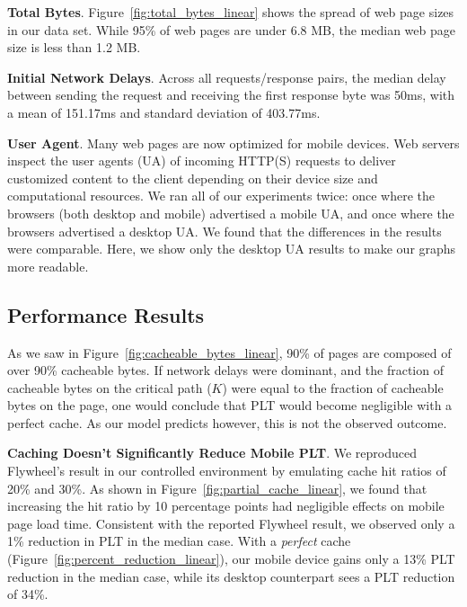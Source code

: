 \textbf{Total Bytes}. Figure~\ref{fig:total_bytes_linear} shows the spread of web page sizes in our data set. While 95\% of web pages are under 6.8 MB, the median web page size is less than 1.2 MB.

\textbf{Initial Network Delays}. Across all requests/response pairs, the median delay between sending the request and receiving the first response byte was 50ms, with a mean of 151.17ms and standard deviation of 403.77ms.

\textbf{User Agent}. Many web pages are now optimized for mobile devices. Web
servers inspect the user agents (UA) of incoming HTTP(S) requests to deliver
customized content to the client depending on their device size and
computational resources. We ran all of our experiments twice: once where the
browsers (both desktop and mobile) advertised a mobile UA, and once where the
browsers advertised a desktop UA. We found that the differences in the results
were comparable. Here, we show only the desktop UA results to make our graphs more readable.

\subsection{Performance Results}
As we saw in Figure~\ref{fig:cacheable_bytes_linear}, 90\% of pages are composed of over 90\% cacheable bytes.
If network delays were dominant, and the fraction of cacheable bytes on the critical path ($K$) were equal to the fraction of cacheable bytes on the page, one would conclude that PLT would become negligible with a perfect cache. As our model predicts however, this is not the observed outcome.

\textbf{Caching Doesn't Significantly Reduce Mobile PLT}.
We reproduced Flywheel's result in our controlled environment by emulating cache hit ratios of 20\% and 30\%. As shown in Figure~\ref{fig:partial_cache_linear}, we found that increasing the hit ratio by 10 percentage points had negligible effects on mobile page load time. Consistent with the reported Flywheel result, we observed only a 1\% reduction in PLT in the median case.
With a {\em perfect} cache (Figure~\ref{fig:percent_reduction_linear}), our mobile device gains only a 13\% PLT reduction
in the median case, while its desktop counterpart sees a PLT reduction of
34\%.

